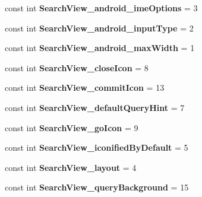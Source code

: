 \begin{DoxyCompactItemize}
const int {\bfseries Search\+View\+\_\+android\+\_\+ime\+Options} = 3
\item 
\mbox{\label{classXaria_1_1Resource_1_1Styleable_a87a39e0a6420feb37ceababbfef47531}} 
const int {\bfseries Search\+View\+\_\+android\+\_\+input\+Type} = 2
\item 
\mbox{\label{classXaria_1_1Resource_1_1Styleable_a7d8552aab2a71834c66eec9680a6f98f}} 
const int {\bfseries Search\+View\+\_\+android\+\_\+max\+Width} = 1
\item 
\mbox{\label{classXaria_1_1Resource_1_1Styleable_ad3bd889ba2319a446505081ab8321a53}} 
const int {\bfseries Search\+View\+\_\+close\+Icon} = 8
\item 
\mbox{\label{classXaria_1_1Resource_1_1Styleable_a103c859e49b745627bd173945bd136c5}} 
const int {\bfseries Search\+View\+\_\+commit\+Icon} = 13
\item 
\mbox{\label{classXaria_1_1Resource_1_1Styleable_ae42ca5f7a6f76ccffc7aa2f7bb229c19}} 
const int {\bfseries Search\+View\+\_\+default\+Query\+Hint} = 7
\item 
\mbox{\label{classXaria_1_1Resource_1_1Styleable_af1a62a3ccf004c791b1498f52b840dee}} 
const int {\bfseries Search\+View\+\_\+go\+Icon} = 9
\item 
\mbox{\label{classXaria_1_1Resource_1_1Styleable_af1cf6a43d71ecd240eaeacfe1f8a7212}} 
const int {\bfseries Search\+View\+\_\+iconified\+By\+Default} = 5
\item 
\mbox{\label{classXaria_1_1Resource_1_1Styleable_aef817c9200543431db3225549e105ca4}} 
const int {\bfseries Search\+View\+\_\+layout} = 4
\item 
\mbox{\label{classXaria_1_1Resource_1_1Styleable_ab35d1b0acc5a9132a6de2c7588371d51}} 
const int {\bfseries Search\+View\+\_\+query\+Background} = 15
\item 

\end{DoxyCompactItemize}
